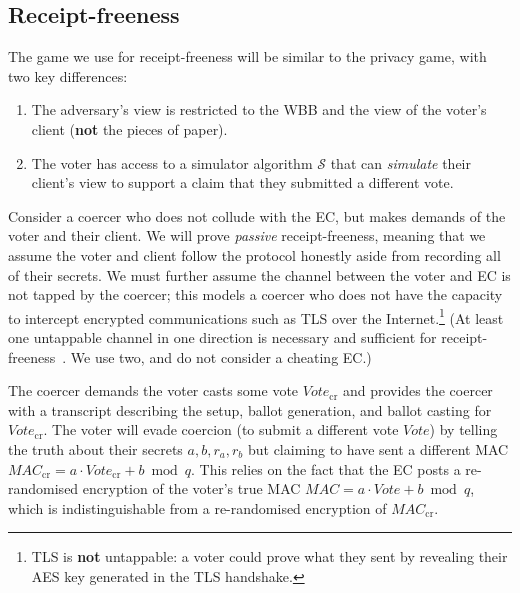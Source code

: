 \documentclass[12pt,a4paper]{article}
\theoremstyle{definition}
\newcommand{\Vote}{\mathit{Vote}}
\newcommand{\Mac}{\mathit{MAC}}
\begin{document}
\subsection{Receipt-freeness}
The game we use for receipt-freeness will be similar to the privacy game, with two key differences:
\begin{enumerate}
    \item The adversary's view is restricted to the WBB and the view of the voter's client (\textbf{not} the pieces of paper).
    \item The voter has access to a simulator algorithm $\mathcal{S}$ that can \textit{simulate} their client's view to support a claim that they submitted a different vote.
\end{enumerate}

Consider a coercer who does not collude with the EC, but makes demands of the voter and their client. We will prove \textit{passive} receipt-freeness, meaning that we assume the voter and client follow the protocol honestly aside from recording all of their secrets. We must further assume the channel between the voter and EC is not tapped by the coercer; this models a coercer who does not have the capacity to intercept encrypted communications such as TLS over the Internet.\footnote{TLS is \textbf{not} untappable: a voter could prove what they sent by revealing their AES key generated in the TLS handshake.} (At least one untappable channel in one direction is necessary and sufficient for receipt-freeness~\cite{hirt2000efficient}. We use two, and do not consider a cheating EC.)

The coercer demands the voter casts some vote $\Vote_{\text{cr}}$ and provides the coercer with a transcript describing the setup, ballot generation, and ballot casting for $\Vote_{\text{cr}}$. The voter will evade coercion (to submit a different vote $\Vote$) by telling the truth about their secrets $a, b, r_a, r_b$ but claiming to have sent a different MAC $\Mac_{\text{cr}} = a\cdot \Vote_{\text{cr}} + b \bmod q$. This relies on the fact that the EC posts a re-randomised encryption of the voter's true MAC $\Mac = a \cdot \Vote + b \bmod q$, which is indistinguishable from a re-randomised encryption of $\Mac_{\text{cr}}$.
\end{document}
